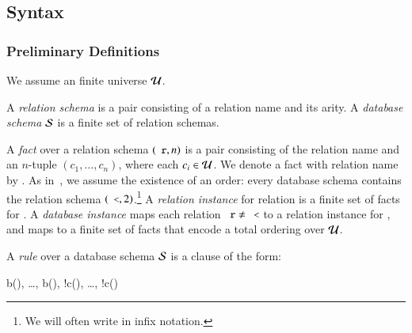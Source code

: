 
\subsection{Syntax}

\subsubsection{Preliminary Definitions}


We assume an finite universe $\univ$.

A {\em relation schema} is a pair consisting of a relation name and its arity.
A {\em database schema} $\schema$ is a finite set of relation schemas.

A {\em fact} over a relation schema $(\dedalus{r}, n)$ is a pair consisting of
the relation name  and an $n$-tuple $(c_1,\ldots,c_n)$, where each
$c_i \in \univ$.  We denote a fact with relation name  by
.  As in~\cite{immerman-ptime}, we assume
the existence of an order: every database schema contains the relation schema
$(\dedalus{<},2)$.\footnote{We will often write \dedalus{<} in infix notation.} 
A {\em relation instance} for relation  is a finite set of facts for
.  A {\em database instance} maps each relation $\dedalus{r} \ne
\dedalus{<}$ to a relation instance for , and maps \dedalus{<} to a
finite set of \dedalus{<} facts that encode a total ordering over $\univ$.

A {\em rule} over a database schema $\schema$ is a clause of the form:

\begin{Drules}
        {b(), \ldots, b(), !c(), \ldots, !c()}
\end{Drules}

